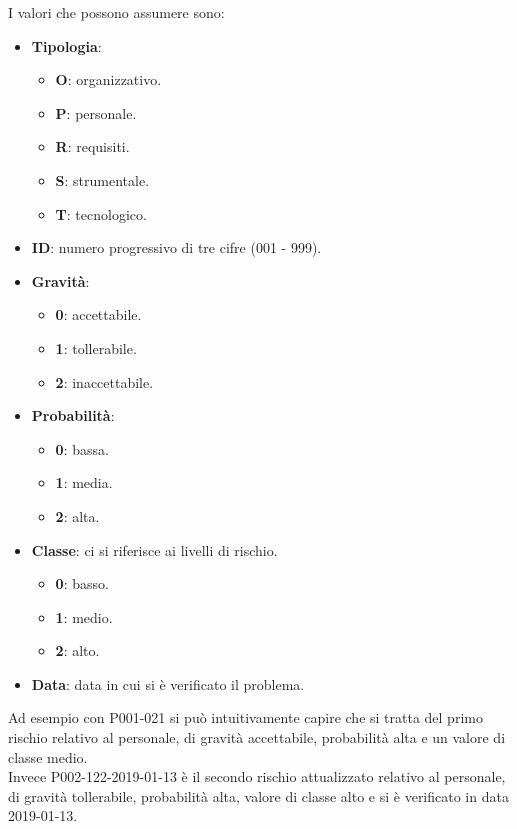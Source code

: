 			I valori che possono assumere sono:

			\begin{itemize}
				\item \textbf{Tipologia}:
				\begin{itemize}
					\item \textbf{O}: organizzativo.
					\item \textbf{P}: personale.
					\item \textbf{R}: requisiti.
					\item \textbf{S}: strumentale.
					\item \textbf{T}: tecnologico.
				\end{itemize}
				\item \textbf{ID}: numero progressivo di tre cifre (001 - 999).
				\item \textbf{Gravità}:
				\begin{itemize}
					\item \textbf{0}: accettabile.
					\item \textbf{1}: tollerabile.
					\item \textbf{2}: inaccettabile.
				\end{itemize}

				\item \textbf{Probabilità}:
				\begin{itemize}
					\item \textbf{0}: bassa.
					\item \textbf{1}: media.
					\item \textbf{2}: alta.
				\end{itemize}

				\item \textbf{Classe}: ci si riferisce ai livelli di rischio.
				\begin{itemize}
					\item \textbf{0}: basso.
					\item \textbf{1}: medio.
					\item \textbf{2}: alto.
				\end{itemize}

				\item \textbf{Data}: data in cui si è verificato il problema.
			\end{itemize}

			Ad esempio con P001-021 si può intuitivamente capire che si tratta del primo rischio relativo al personale, di gravità accettabile,
			probabilità alta e un valore di classe medio.\\
			Invece P002-122-2019-01-13 è il secondo rischio attualizzato relativo al personale, di gravità tollerabile, probabilità alta, valore di classe alto e si è verificato in data 2019-01-13.
            
